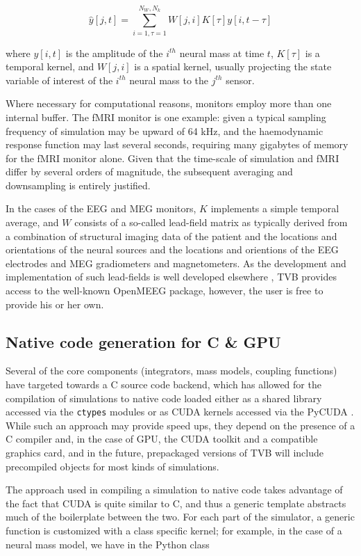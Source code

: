 	\[ \hat{y}[j, t] = \sum_{i=1, \tau=1}^{N_W, N_k} W[j, i] K[\tau] y[i, t-\tau] \]

	\noindent where $y[i, t]$ is the amplitude of the $i^{th}$ neural mass at time
	$t$, $K[\tau]$ is a temporal kernel, and $W[j, i]$ is a spatial kernel,
	usually projecting the state variable of interest of the $i^{th}$ 
	neural mass to the $j^{th}$ sensor. 

	Where necessary for computational reasons, monitors employ more than 
	one internal buffer. The fMRI monitor is one 
	example: given a typical sampling frequency of simulation may be upward of 
	64 kHz, and the haemodynamic response function may last several seconds, 
	requiring many gigabytes of memory for the fMRI monitor alone. Given that 
	the time-scale of simulation and fMRI differ by several orders of magnitude, 
	the subsequent averaging and downsampling is entirely justified. 

	In the cases of the EEG and MEG monitors, $K$ implements a simple
	temporal average, and $W$ consists of a so-called lead-field matrix as typically
	derived from a combination of structural imaging data of the patient 
	and the locations and orientations of the neural sources and the locations
	and orientions of the EEG electrodes and MEG gradiometers and magnetometers. 
	As the development and implementation of such lead-fields is well developed
	elsewhere \cite{Jirsa_2002,Nolte2003,Gramfort_2010}, TVB provides access
	to the well-known OpenMEEG package, however, the user is free to provide 
	his or her own.

\subsection{Native code generation for C \& GPU}

	Several of the core components (integrators, mass models, coupling
	functions) have targeted towards a C source code backend, which has
	allowed for the compilation of simulations to native code loaded 
	either as a shared library accessed via the \texttt{ctypes} modules
	or as CUDA kernels accessed via the PyCUDA \cite{PyCUDA}.
	While such an approach may provide speed ups, they depend on the
	presence of a C compiler and, in the case of GPU, the CUDA toolkit and
	a compatible graphics card, and in the future, prepackaged versions of TVB
	will include precompiled objects for most kinds of simulations. 

	The approach used in compiling a simulation to native code takes advantage
	of the fact that CUDA is quite similar to C, and thus a generic template
	abstracts much of the boilerplate between the two. For each part of the 
	simulator, a generic function is customized with a class specific kernel;
	for example, in the case of a neural mass model, we have in the Python class

